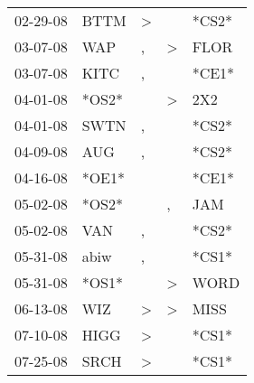 \begin{supertabular}{p{0.07\textwidth}p{0.06\textwidth}p{0.02\textwidth}p{0.02\textwidth}p{0.06\textwidth}}
          02-29-08\textsuperscript{} &           BTTM\textsuperscript{} &     \textgreater &                  &                            *CS2* \\
          03-07-08\textsuperscript{} &            WAP\textsuperscript{} &                , &     \textgreater &           FLOR\textsuperscript{} \\
          03-07-08\textsuperscript{} &           KITC\textsuperscript{} &                , &                  &                            *CE1* \\
          04-01-08\textsuperscript{} &                            *OS2* &                  &     \textgreater &            2X2\textsuperscript{} \\
          04-01-08\textsuperscript{} &           SWTN\textsuperscript{} &                , &                  &                            *CS2* \\
          04-09-08\textsuperscript{} &            AUG\textsuperscript{} &                , &                  &                            *CS2* \\
          04-16-08\textsuperscript{} &                            *OE1* &                  &                  &                            *CE1* \\
          05-02-08\textsuperscript{} &                            *OS2* &                  &                , &            JAM\textsuperscript{} \\
          05-02-08\textsuperscript{} &            VAN\textsuperscript{} &                , &                  &                            *CS2* \\
          05-31-08\textsuperscript{} &           abiw\textsuperscript{} &                , &                  &                            *CS1* \\
          05-31-08\textsuperscript{} &                            *OS1* &                  &     \textgreater &           WORD\textsuperscript{} \\
          06-13-08\textsuperscript{} &            WIZ\textsuperscript{} &     \textgreater &     \textgreater &           MISS\textsuperscript{} \\
          07-10-08\textsuperscript{} &           HIGG\textsuperscript{} &     \textgreater &                  &                            *CS1* \\
          07-25-08\textsuperscript{} &           SRCH\textsuperscript{} &     \textgreater &                  &                            *CS1* \\

\end{supertabular}
